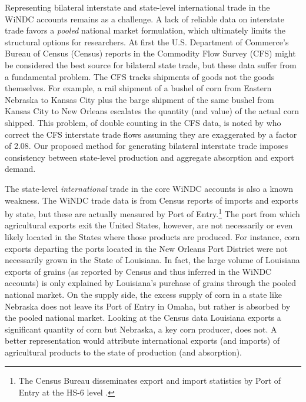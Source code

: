 \documentclass{ejb}
\begin{document}
Representing bilateral interstate and state-level international trade
in the WiNDC accounts remains as a challenge. A lack of reliable data 
on interstate trade favors a \emph{pooled} national market
formulation, which ultimately limits the structural options for
researchers.  At first the U.S. Department of Commerce's Bureau of
Census (Census) reports in the Commodity Flow Survey (CFS) might be
considered the best source for bilateral state trade, but these data
suffer from a fundamental problem.  The CFS tracks shipments of goods not
the goods themselves.  For example, a rail shipment of a bushel of
corn from Eastern Nebraska to Kansas City plus the barge shipment of the
same bushel from Kansas City to New Orleans escalates the quantity
(and value) of the actual corn shipped.  This problem, of double
counting in the CFS data, is noted by \citet{AvW} who
correct the CFS interstate trade flows assuming they are exaggerated
by a factor of 2.08.  Our proposed method for generating bilateral
interstate trade imposes consistency between state-level production
and aggregate absorption and export demand. 

The state-level \emph{international} trade in the core WiNDC accounts is also
a known weakness.  The WiNDC trade data is from Census
reports of imports and exports by state, but these are actually
measured by Port of Entry.\footnote{The Census Bureau 
	disseminates export and import statistics by Port of Entry at
	the HS-6 level \citep{Census}.}  
The port from which agricultural exports exit the United States,
however, are not necessarily or even likely located in the States where
those products are produced.  For instance, corn exports departing the
ports located in the New Orleans Port District were not necessarily
grown in the State of Louisiana.  In fact, the large volume of
Louisiana exports of grains (as reported by Census and thus inferred
in the WiNDC accounts) is only explained by Louisiana's purchase of
grains through the pooled national market.  On the supply side, the
excess supply of corn in a state like Nebraska does not leave its Port
of Entry in Omaha, but rather is absorbed by the pooled national
market.  Looking at the Census data Louisiana exports a significant
quantity of corn but Nebraska, a key corn producer, does not.  A
better representation would attribute international exports (and
imports) of agricultural products to the state of production (and
absorption).  
 
\end{document}
